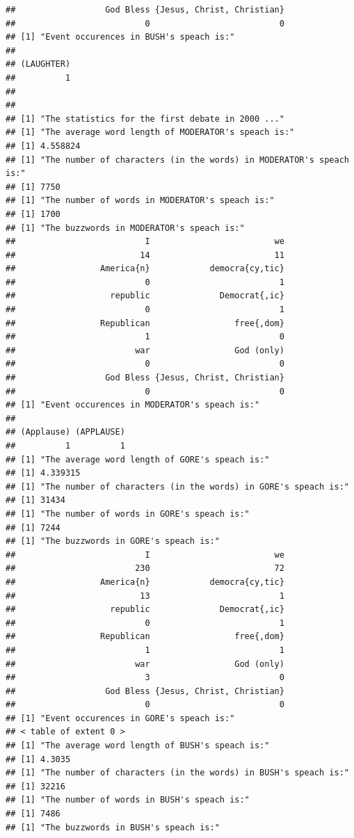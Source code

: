 \documentclass{article}\usepackage[]{graphicx}\usepackage[]{color}
\makeatletter
\newenvironment{kframe}{%
 \def\at@end@of@kframe{}%
 \ifinner\ifhmode%
  \def\at@end@of@kframe{\end{minipage}}%
  \begin{minipage}{\columnwidth}%
 \fi\fi%
 \def\FrameCommand##1{\hskip\@totalleftmargin \hskip-\fboxsep
 \colorbox{shadecolor}{##1}\hskip-\fboxsep
     \hskip-\linewidth \hskip-\@totalleftmargin \hskip\columnwidth}%
 \MakeFramed {\advance\hsize-\width
   \@totalleftmargin\z@ \linewidth\hsize
   \@setminipage}}%
 {\par\unskip\endMakeFramed%
 \at@end@of@kframe}
\newenvironment{knitrout}{}{} %
\makeatother
\begin{document}
\begin{knitrout}
\begin{kframe}
\begin{verbatim}
##                  God Bless {Jesus, Christ, Christian} 
##                          0                          0 
## [1] "Event occurences in BUSH's speach is:"
## 
## (LAUGHTER) 
##          1 
## 
## 
## [1] "The statistics for the first debate in 2000 ..."
## [1] "The average word length of MODERATOR's speach is:"
## [1] 4.558824
## [1] "The number of characters (in the words) in MODERATOR's speach is:"
## [1] 7750
## [1] "The number of words in MODERATOR's speach is:"
## [1] 1700
## [1] "The buzzwords in MODERATOR's speach is:"
##                          I                         we 
##                         14                         11 
##                 America{n}            democra{cy,tic} 
##                          0                          1 
##                   republic              Democrat{,ic} 
##                          0                          1 
##                 Republican                 free{,dom} 
##                          1                          0 
##                        war                 God (only) 
##                          0                          0 
##                  God Bless {Jesus, Christ, Christian} 
##                          0                          0 
## [1] "Event occurences in MODERATOR's speach is:"
## 
## (Applause) (APPLAUSE) 
##          1          1 
## [1] "The average word length of GORE's speach is:"
## [1] 4.339315
## [1] "The number of characters (in the words) in GORE's speach is:"
## [1] 31434
## [1] "The number of words in GORE's speach is:"
## [1] 7244
## [1] "The buzzwords in GORE's speach is:"
##                          I                         we 
##                        230                         72 
##                 America{n}            democra{cy,tic} 
##                         13                          1 
##                   republic              Democrat{,ic} 
##                          0                          1 
##                 Republican                 free{,dom} 
##                          1                          1 
##                        war                 God (only) 
##                          3                          0 
##                  God Bless {Jesus, Christ, Christian} 
##                          0                          0 
## [1] "Event occurences in GORE's speach is:"
## < table of extent 0 >
## [1] "The average word length of BUSH's speach is:"
## [1] 4.3035
## [1] "The number of characters (in the words) in BUSH's speach is:"
## [1] 32216
## [1] "The number of words in BUSH's speach is:"
## [1] 7486
## [1] "The buzzwords in BUSH's speach is:"

\end{verbatim}
\end{kframe}
\end{knitrout}
\end{document}
